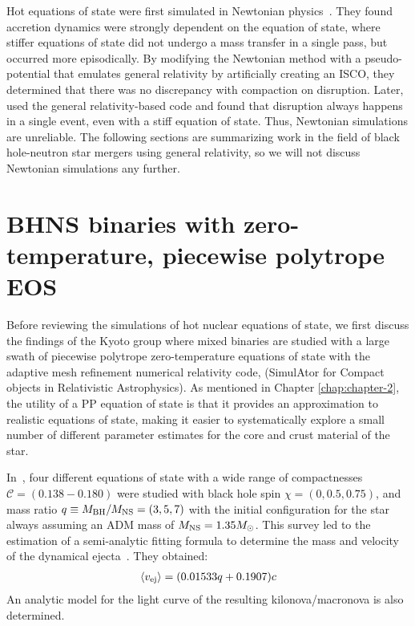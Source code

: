 Hot equations of state were first simulated in Newtonian physics~\cite{ruff1996-leakage_part1,ruff1997-leakage_part2,ruff2001-leakage_part3,ross2002-leakage_part1,ross2003-leakage_part2,ross2003-leakage_part3}.
They found accretion dynamics were strongly dependent on the equation of state, where stiffer equations of state did not undergo a mass transfer in a single pass, but occurred more episodically.
By modifying the Newtonian method with a pseudo-potential that emulates general relativity by artificially creating an ISCO, they determined that there was no discrepancy with compaction on disruption. 
Later,~\cite{Duez:2009yy} used the general relativity-based code and found that disruption always happens in a single event, even with a stiff equation of state.
Thus, Newtonian simulations are unreliable.
The following sections are summarizing work in the field of black hole-neutron star mergers using general relativity, so we will not discuss Newtonian simulations any further.

\section{BHNS binaries with zero-temperature, piecewise polytrope EOS}

Before reviewing the simulations of hot nuclear equations of state, 
we first discuss the findings of the Kyoto group where mixed binaries are studied with a large swath of piecewise polytrope zero-temperature equations of state with the adaptive mesh refinement numerical relativity code, \SACRA (SimulAtor for Compact objects in Relativistic Astrophysics).  
As mentioned in Chapter \ref{chap:chapter-2}, the utility of a PP equation of state is that it provides an approximation to realistic equations of state, making it easier to systematically explore a small number of different parameter estimates for the core and crust material of the star.  

In~\cite{Kyutoku:2013}, four different equations of state with a wide range of compactnesses $\mathcal{C} = (0.138 - 0.180)$ were studied with black hole spin $\chi = (0, 0.5, 0.75)$, and mass ratio $q \equiv M_{\rm BH}/M_{\rm NS} = (3, 5, 7)$ with the initial configuration for the star always assuming an ADM mass of $M_{\rm NS} = 1.35 M_\odot$.
This survey led to the estimation of a semi-analytic fitting formula to determine the mass and velocity of the dynamical ejecta~\cite{Kyutoku:2015}.  They obtained:
\begin{align}
\label{e:vej_sacra}
\left\langle v_{\rm ej} \right\rangle = (0.01533 q + 0.1907) c
\end{align}
An analytic model for the light curve of the resulting kilonova/macronova is also determined.

